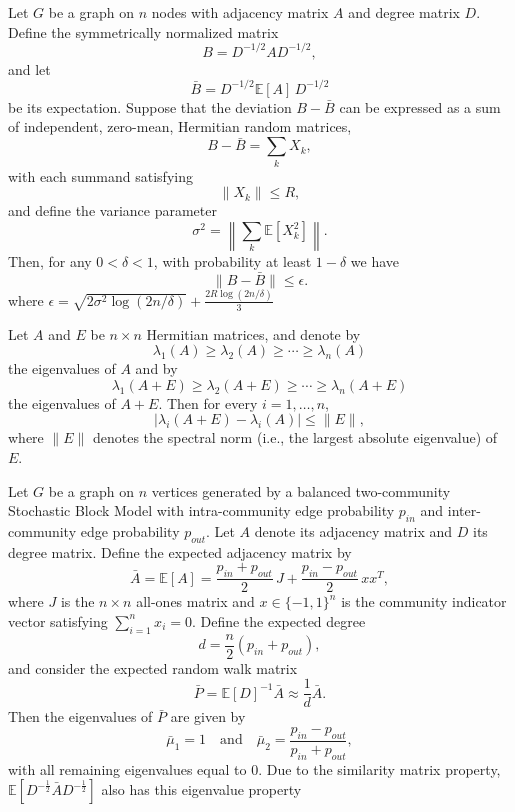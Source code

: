 \begin{lemma}\label{lem:bernstein}
Let \(G\) be a graph on \(n\) nodes with adjacency matrix \(A\) and degree matrix \(D\). Define the symmetrically normalized matrix
\[
B = D^{-1/2} A D^{-1/2},
\]
and let
\[
\bar{B} = D^{-1/2}\mathbb{E}[A]\,D^{-1/2}
\]
be its expectation. Suppose that the deviation \(B-\bar{B}\) can be expressed as a sum of independent, zero-mean, Hermitian random matrices,
\[
B-\bar{B}=\sum_{k}X_k,
\]
with each summand satisfying
\[
\|X_k\|\le R,
\]
and define the variance parameter
\[
\sigma^2 = \left\|\sum_{k}\mathbb{E}[X_k^2]\right\|.
\]
Then, for any \(0<\delta<1\), with probability at least \(1-\delta\) we have
\[
\|B-\bar{B}\| \le \epsilon.
\]
where $\epsilon = \sqrt{2\sigma^2\log(2n/\delta)} + \frac{2R\log(2n/\delta)}{3}$
\end{lemma}
\begin{lemma}\label{lem:Weyl}
Let \(A\) and \(E\) be \(n\times n\) Hermitian matrices, and denote by
\[
\lambda_1(A) \ge \lambda_2(A) \ge \cdots \ge \lambda_n(A)
\]
the eigenvalues of \(A\) and by
\[
\lambda_1(A+E) \ge \lambda_2(A+E) \ge \cdots \ge \lambda_n(A+E)
\]
the eigenvalues of \(A+E\). Then for every \(i=1,\ldots,n\),
\[
\bigl|\lambda_i(A+E) - \lambda_i(A)\bigr| \le \|E\|,
\]
where \(\|E\|\) denotes the spectral norm (i.e., the largest absolute eigenvalue) of \(E\).
\end{lemma}
\begin{lemma}\label{lem:expectation-spectrum}
Let \(G\) be a graph on \(n\) vertices generated by a balanced two-community Stochastic Block Model with intra-community edge probability \(p_{in}\) and inter-community edge probability \(p_{out}\). Let \(A\) denote its adjacency matrix and \(D\) its degree matrix. Define the expected adjacency matrix by
\[
\bar{A} = \mathbb{E}[A] = \frac{p_{in}+p_{out}}{2}\,J + \frac{p_{in}-p_{out}}{2}\,xx^T,
\]
where \(J\) is the \(n\times n\) all-ones matrix and \(x\in \{-1,1\}^n\) is the community indicator vector satisfying \(\sum_{i=1}^n x_i=0\). Define the expected degree
\[
d = \frac{n}{2}(p_{in}+p_{out}),
\]
and consider the expected random walk matrix
\[
\bar{P} = \mathbb{E}[D]^{-1}\bar{A} \approx \frac{1}{d}\bar{A}.
\]
Then the eigenvalues of \(\bar{P}\) are given by
\[
\bar{\mu}_1 = 1 \quad \text{and} \quad \bar{\mu}_2 = \frac{p_{in}-p_{out}}{p_{in}+p_{out}},
\]
with all remaining eigenvalues equal to 0. Due to the similarity matrix property, $\mathbb{E}[D^{-\frac{1}{2}}\bar{A}D^{-\frac{1}{2}}]$ also has this eigenvalue property
\end{lemma}
